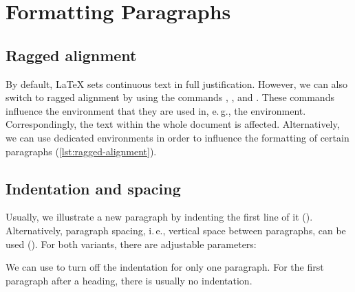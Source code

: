 \chapter{Formatting Paragraphs} %
\label{sec:formatting-paragraphs}

\section*{Ragged alignment}
\label{sec:ragged-alignment}
By default, \LaTeX{} sets continuous text in full justification. 
However, we can also switch to ragged alignment by using the commands 
, , and 
. 
These commands influence the environment that they are used in, e.\,g., the 
 environment. Correspondingly, the text within the whole 
document is affected. 
Alternatively, we can use dedicated environments in order to influence the 
formatting
of certain paragraphs (\cref{lst:ragged-alignment}).


\section*{Indentation and spacing}
\label{sec:indents-and-parskips}
Usually, we illustrate a new paragraph by indenting the first line of it 
(). 
Alternatively, paragraph spacing, i.\,e., vertical space between paragraphs, 
can be used ().
For both variants, there are adjustable parameters:

\noindent We can use  to turn off the indentation for only one 
paragraph. 
For the first paragraph after a heading, there is usually no indentation. 

